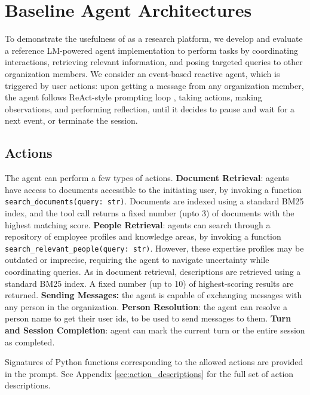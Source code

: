
\section{Baseline Agent Architectures}

To demonstrate the usefulness of \asyncfw{} as a research platform, we develop and evaluate a reference  
LM-powered agent implementation to perform tasks by coordinating interactions, retrieving relevant information, and posing targeted queries to other organization members. 
We consider an event-based reactive agent, which is triggered by user actions: upon getting a message from any organization member, the agent follows ReAct-style prompting loop \cite{DBLP:conf/iclr/YaoZYDSN023}, taking actions, making observations, and performing reflection, until it decides to pause and wait for a next event, or terminate the session.




\subsection{Actions}

The agent can perform a few types of actions.
\textbf{Document Retrieval}:
agents have access to documents accessible to the initiating user, by invoking a function \texttt{search\_documents(query: str)}. Documents are indexed using a standard BM25 index, and the tool call returns a fixed number (upto 3) of documents with the highest matching score. 
\textbf{People Retrieval}:
agents can search through a repository of employee profiles and knowledge areas, by invoking a function \texttt{search\_relevant\_people(query: str)}. 
However, these expertise profiles may be outdated or imprecise, requiring the agent to navigate uncertainty while coordinating queries. As in document retrieval, descriptions are retrieved using a standard BM25 index. A fixed number (up to 10) of highest-scoring results are returned.
\textbf{Sending Messages:} 
the agent is capable of exchanging messages with any person in the organization. 
\textbf{Person Resolution}:
the agent can resolve a person name to get their user ids, to be used to send messages to them.
\textbf{Turn and Session Completion}: agent can mark the current turn or the entire session as completed. 

Signatures of Python functions corresponding to the allowed actions are provided in the prompt. See Appendix \ref{sec:action_descriptions} for the full set of action descriptions. %



